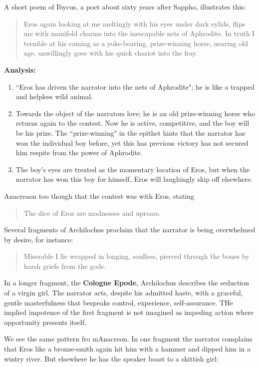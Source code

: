 A short poem of Ibycus, a poet about sixty years after Sappho, illustrates this:

\begin{quotation}
    Eros again looking at me meltingly with his eyes under dark eylids, flips me with manifold charms into the inescapable nets of Aphrodite. In truth I termble at his coming as a yoke-bearing, prize-winning horse, nearing old age, unwillingly goes with his quick chariot into the fray.
\end{quotation}

\textbf{Analysis:}
\begin{enumerate}
    \item ``Eros has driven the narrator into the nets of Aphrodite"; he is like a trapped and helpless wild animal.
    \item Towards the object of the narrators love; he is an old prize-winning horse who returns again to the contest. Now he is active, competitive, and the boy will be his prize. The ``prize-winning" in the epithet hints that the narrator has won the individual boy before, yet this has previous victory has not secured him respite from the power of Aphrodite.
    \item The boy's eyes are treated as the momentary location of Eros, but when the narrator has won this boy for himself, Eros will laughingly skip off elsewhere.
\end{enumerate}

Anacreaon too though that the contest was with Eros, stating \begin{quotation}
    The dice of Eros are madnesses and uproars.
\end{quotation}
Several fragments of Archilochus proclaim that the narrator is being overwhelmed by desire, for instance: \begin{quotation}
    Miserable I lie wrapped in longing, soulless, pierced through the bones by harsh griefs from the gods.
\end{quotation}

In a longer fragment, the \textbf{Cologne Epode}, Archilochus describes the seduction of a virgin girl. The narrator acts, despite his admitted haste, with a graceful, gentle masterfulness that bespeaks control, experience, self-assurance. THe implied impotence of the first fragment is not imagined as impeding action where opportunity presents itself.

We see the same pattern fro mAnacreon. In one fragment the narrator complains that Eros like a bronze-smith again hit him with a hammer and dipped him in a wintry river. But elsewhere he has the speaker boast to a skittish girl: 

